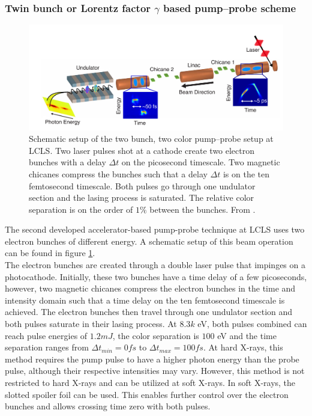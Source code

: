 \subsubsection{Twin bunch or Lorentz factor $\gamma$ based pump--probe scheme}
\begin{figure}
	\centering
		\includegraphics[width=1.00\textwidth]{images/Agos-pump-probe-scheme.png}
	\caption[Schematic setup of a bunch based pump-probe setup.]{Schematic setup of the two bunch, two color pump--probe setup at LCLS. Two laser pulses shot at a cathode create two electron bunches with a delay $\Delta t$ on the picosecond timescale. Two magnetic chicanes compress the bunches such that a delay $\Delta t$ is on the ten femtosecond timescale. Both pulses go through one undulator section and the lasing process is saturated. The relative color separation is on the order of $1\%$ between the bunches. From \citep[\href{http://creativecommons.org/licenses/by/4.0/}{\ccby}]{Marinelli-2015-NatComm}.}
	\label{fig:Agos-pump-probe-scheme}
\end{figure}
The second developed accelerator-based pump-probe technique at LCLS \cite{Marinelli-2015-NatComm} uses two electron bunches of different energy. A schematic setup of this beam operation can be found in figure \ref{fig:Agos-pump-probe-scheme}.\\
The electron bunches are created through a double laser pulse that impinges on a photocathode. Initially, these two bunches have a time delay of a few picoseconds, however, two magnetic chicanes compress the electron bunches in the time and intensity domain such that a time delay on the ten femtosecond timescale is achieved. The electron bunches then travel through one undulator section and both pulses saturate in their lasing process. At $8.3k$ eV, both pulses combined can reach pulse energies of $1.2mJ$, the color separation is $100$ eV and the time separation ranges from $\Delta t_{min}=0fs$ to $\Delta t_{max}=100fs$. At hard X-rays, this method requires the pump pulse to have a higher photon energy than the probe pulse, although their respective intensities may vary. However, this method is not restricted to hard X-rays and can be utilized at soft X-rays. In soft X-rays, the slotted spoiler foil can be used. This enables further control over the electron bunches and allows crossing time zero with both pulses.
